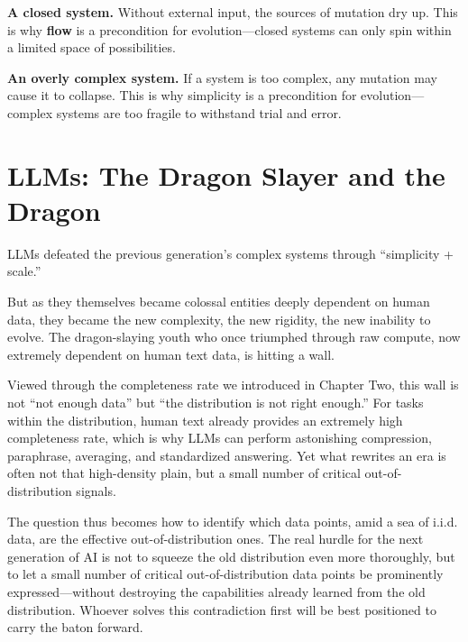 \textbf{A closed system.} Without external input, the sources of mutation dry up. This is why \textbf{flow} is a precondition for evolution---closed systems can only spin within a limited space of possibilities.

\textbf{An overly complex system.} If a system is too complex, any mutation may cause it to collapse. This is why simplicity is a precondition for evolution---complex systems are too fragile to withstand trial and error.

\section{LLMs: The Dragon Slayer and the Dragon}



LLMs defeated the previous generation's complex systems through ``simplicity + scale.''

But as they themselves became colossal entities deeply dependent on human data, they became the new complexity, the new rigidity, the new inability to evolve. The dragon-slaying youth who once triumphed through raw compute, now extremely dependent on human text data, is hitting a wall.

\vspace{1em}

Viewed through the completeness rate we introduced in Chapter Two, this wall is not ``not enough data'' but ``the distribution is not right enough.'' For tasks within the distribution, human text already provides an extremely high completeness rate, which is why LLMs can perform astonishing compression, paraphrase, averaging, and standardized answering. Yet what rewrites an era is often not that high-density plain, but a small number of critical out-of-distribution signals.

\vspace{1em}

The question thus becomes how to identify which data points, amid a sea of i.i.d. data, are the effective out-of-distribution ones. The real hurdle for the next generation of AI is not to squeeze the old distribution even more thoroughly, but to let a small number of critical out-of-distribution data points be prominently expressed---without destroying the capabilities already learned from the old distribution. Whoever solves this contradiction first will be best positioned to carry the baton forward.

